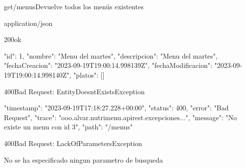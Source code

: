 \begin{apiRoute}{get}{/menus}{Devuelve todos los menús existentes}
	
	\begin{routeParameter}
	\end{routeParameter}
	
	\begin{routeResponse}{application/json}
		\begin{routeResponseItem}{200}{ok}
			\begin{routeResponseItemBody}
{
	"id": 1,
	"nombre": "Menu del martes",
	"descripcion": "Menu del martes",
	"fechaCreacion": "2023-09-19T19:00:14.998139Z",
	"fechaModificacion": "2023-09-19T19:00:14.998140Z",
	"platos": []
}
			\end{routeResponseItemBody}
		\end{routeResponseItem}
		\begin{routeResponseItem}{400}{Bad Request: EntityDoesntExistsException}
			\begin{routeResponseItemBody}
{
    "timestamp": "2023-09-19T17:18:27.228+00:00",
    "status": 400,
    "error": "Bad Request",
    "trace": "ooo.alvar.nutrimenu.apirest.excepciones...",
    "message": "No existe un menu con id 3",
    "path": "/menus"
}
			\end{routeResponseItemBody}
		\end{routeResponseItem}
		\begin{routeResponseItem}{400}{Bad Request: LackOfParametersException}
			\begin{routeResponseItemBody}
No se ha especificado ningun parametro de busqueda
			\end{routeResponseItemBody}
		\end{routeResponseItem}
	\end{routeResponse}
	
\end{apiRoute}

